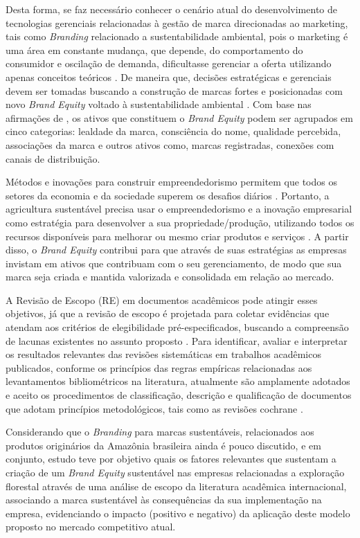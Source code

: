 Desta forma, se faz necessário conhecer o cenário atual do desenvolvimento de tecnologias gerenciais relacionadas à gestão de marca direcionadas ao marketing, tais como \textit{Branding} relacionado a sustentabilidade ambiental, pois o marketing é uma área em constante mudança, que depende, do comportamento do consumidor e oscilação de demanda, dificultasse gerenciar a oferta utilizando apenas conceitos teóricos \cite{Kotler2019MarketingManagement}. De maneira que, decisões estratégicas e gerenciais devem ser tomadas buscando a construção de marcas fortes e posicionadas com novo \textit{Brand Equity} voltado à sustentabilidade ambiental \cite{Rodrigues2018AplicacaoBrasileiras}. Com base nas afirmações de , os ativos que constituem o \textit{Brand Equity} podem ser agrupados em cinco categorias: lealdade da marca, consciência do nome, qualidade percebida, associações da marca e outros ativos como, marcas registradas, conexões com canais de distribuição.

Métodos e inovações para construir empreendedorismo permitem que todos os setores da economia e da sociedade superem os desafios diários \cite{Cuellar-Galvez2018}. Portanto, a agricultura sustentável precisa usar o empreendedorismo e a inovação empresarial como estratégia para desenvolver a sua propriedade/produção, utilizando todos os recursos disponíveis para melhorar ou mesmo criar produtos e serviços \cite{Julien2017}. A partir disso, o \textit{Brand Equity} contribui para que através de suas estratégias as empresas invistam em ativos que contribuam com o seu gerenciamento, de modo que sua marca seja criada e mantida valorizada e consolidada em relação ao mercado.

A Revisão de Escopo (RE) em documentos acadêmicos pode atingir esses objetivos, já que a revisão de escopo é projetada para coletar evidências que atendam aos critérios de elegibilidade pré-especificados, buscando a compreensão de lacunas existentes no assunto proposto \cite{Munn2018SystematicApproach}. Para identificar, avaliar e interpretar os resultados relevantes das revisões sistemáticas em trabalhos acadêmicos publicados, conforme os princípios das regras empíricas relacionadas aos levantamentos bibliométricos na literatura, atualmente são amplamente adotados e aceito os procedimentos de classificação, descrição e qualificação de documentos que adotam princípios metodológicos, tais como as revisões cochrane \cite{Chandler2021}.

Considerando que o \textit{Branding} para marcas sustentáveis, relacionados aos produtos originários da Amazônia brasileira ainda é pouco discutido, e em conjunto, estudo teve por objetivo quais os fatores relevantes que sustentam a criação de um \textit{Brand Equity} sustentável nas empresas relacionadas a exploração florestal através de uma análise de escopo da literatura acadêmica internacional, associando a marca sustentável às consequências da sua implementação na empresa, evidenciando o impacto (positivo e negativo) da aplicação deste modelo proposto no mercado competitivo atual.

